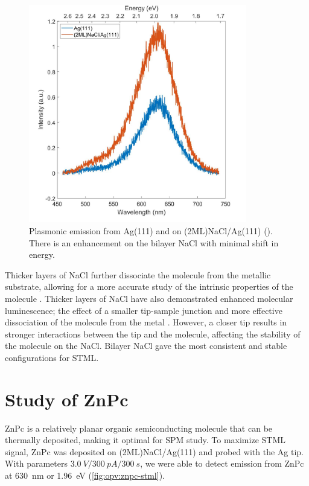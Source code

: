 \begin{figure} [h]
    \centering
    \includegraphics[width=0.85\textwidth]{pictures/NaCl_enhancement_Ag111_275V_250pA_10s.jpg}
    \caption{Plasmonic emission from Ag(111) and on (2ML)NaCl/Ag(111) (). There is an enhancement on the bilayer NaCl with minimal shift in energy. }
    \label{fig:opv:nacl-plasmon}
\end{figure}

Thicker layers of NaCl further dissociate the molecule from the metallic substrate, allowing for a more accurate study of the intrinsic properties of the molecule \citep{repp2005molecules}. Thicker layers of NaCl have also demonstrated enhanced molecular luminescence; the effect of a smaller tip-sample junction and more effective dissociation of the molecule from the metal \citep{Zhang2017,Kroger2018}. However, a closer tip results in stronger interactions between the tip and the molecule, affecting the stability of the molecule on the NaCl. Bilayer NaCl gave the most consistent and stable configurations for \ac{STML}.



\section{Study of {ZnPc}}

\ac{ZnPc} is a relatively planar organic semiconducting molecule that can be thermally deposited, making it optimal for \ac{SPM} study. To maximize \ac{STML} signal, ZnPc was deposited on (2ML)NaCl/Ag(111) and probed with the Ag tip. With parameters $\SI{3.0}{V}/\SI{300}{pA}/\SI{300}{s}$, we were able to detect emission from ZnPc at \SI{630}{nm} or \SI{1.96}{eV} (\autoref{fig:opv:znpc-stml}).

